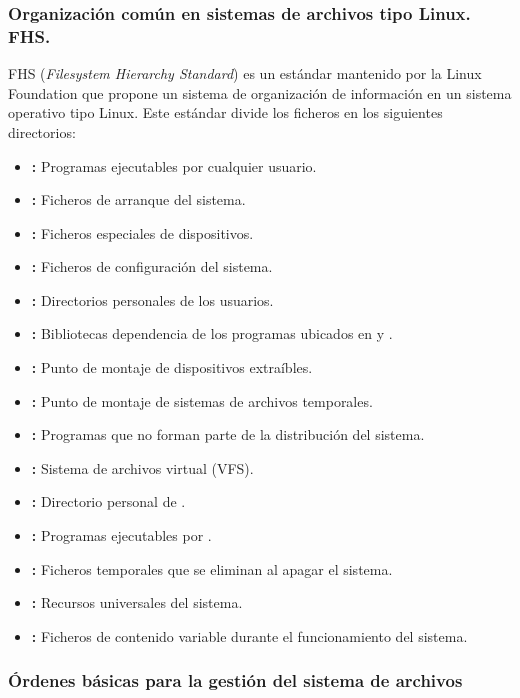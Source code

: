 \subsubsection{Organización común en sistemas de archivos tipo Linux. FHS.}

FHS (\emph{Filesystem Hierarchy Standard}) es un estándar mantenido por la Linux Foundation que propone un sistema de organización de información en un sistema operativo tipo Linux.
Este estándar divide los ficheros en los siguientes directorios:

\begin{itemize}
	\item{}\textbf{:} Programas ejecutables por cualquier usuario.
	\item{}\textbf{:} Ficheros de arranque del sistema.
	\item{}\textbf{:} Ficheros especiales de dispositivos.
	\item{}\textbf{:} Ficheros de configuración del sistema.
	\item{}\textbf{:} Directorios personales de los usuarios.
	\item{}\textbf{:} Bibliotecas dependencia de los programas ubicados en  y .
	\item{}\textbf{:} Punto de montaje de dispositivos extraíbles.
	\item{}\textbf{:} Punto de montaje de sistemas de archivos temporales.
	\item{}\textbf{:} Programas que no forman parte de la distribución del sistema.
	\item{}\textbf{:} Sistema de archivos virtual (VFS).
	\item{}\textbf{:} Directorio personal de .
	\item{}\textbf{:} Programas ejecutables por .
	\item{}\textbf{:} Ficheros temporales que se eliminan al apagar el sistema.
	\item{}\textbf{:} Recursos universales del sistema.
	\item{}\textbf{:} Ficheros de contenido variable durante el funcionamiento del sistema.
\end{itemize}

\subsubsection{Órdenes básicas para la gestión del sistema de archivos}

